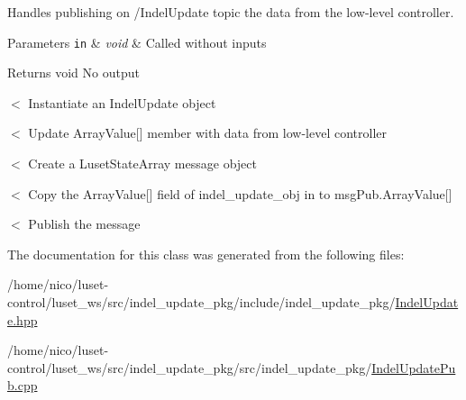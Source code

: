 Handles publishing on /\+Indel\+Update topic the data from the low-\/level controller. 


\begin{DoxyParams}[1]{Parameters}
\mbox{\tt in}  & {\em void} & Called without inputs \\
\hline
\end{DoxyParams}
\begin{DoxyReturn}{Returns}
void No output 
\end{DoxyReturn}
$<$ Instantiate an Indel\+Update object

$<$ Update Array\+Value\mbox{[}\mbox{]} member with data from low-\/level controller

$<$ Create a Luset\+State\+Array message object

$<$ Copy the Array\+Value\mbox{[}\mbox{]} field of indel\+\_\+update\+\_\+obj in to msg\+Pub.\+Array\+Value\mbox{[}\mbox{]}

$<$ Publish the message 

The documentation for this class was generated from the following files\+:\begin{DoxyCompactItemize}
\item 
/home/nico/luset-\/control/luset\+\_\+ws/src/indel\+\_\+update\+\_\+pkg/include/indel\+\_\+update\+\_\+pkg/\hyperlink{IndelUpdate_8hpp}{Indel\+Update.\+hpp}\item 
/home/nico/luset-\/control/luset\+\_\+ws/src/indel\+\_\+update\+\_\+pkg/src/indel\+\_\+update\+\_\+pkg/\hyperlink{IndelUpdatePub_8cpp}{Indel\+Update\+Pub.\+cpp}\end{DoxyCompactItemize}
